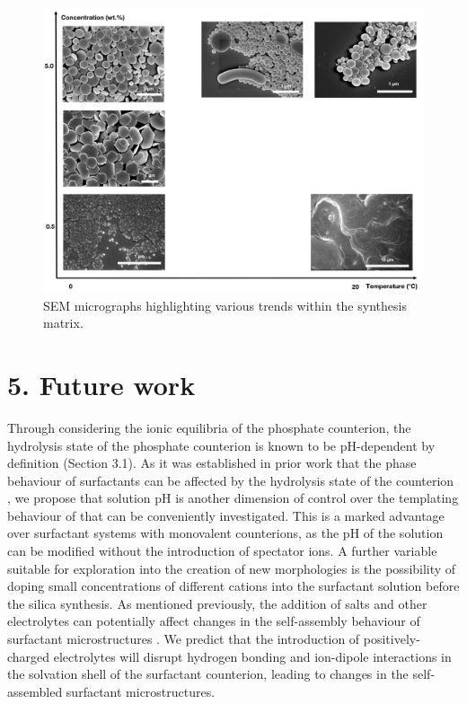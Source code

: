 \documentclass[a4paper,12pt,twocolumn]{article}
\begin{document}
	 	\begin{figure}[!b]
  	 	\centering
		\includegraphics[width=\linewidth]{trends.jpg}
  		\caption{SEM micrographs highlighting various trends within the synthesis matrix.}
  	\end{figure}

	 
	 \section{5. Future work}
	 
	 Through considering the ionic equilibria of the phosphate counterion, the hydrolysis state of the phosphate counterion is known to be pH-dependent by definition (Section 3.1). As it was established in prior work that the phase behaviour of  surfactants can be affected by the hydrolysis state of the counterion \cite{liu2014}, we propose that solution pH is another dimension of control over the templating behaviour of  that can be conveniently investigated. This is a marked advantage over surfactant systems with monovalent counterions, as the pH of the solution can be modified without the introduction of spectator ions. A further variable suitable for exploration into the creation of new morphologies is the possibility of doping small concentrations of different cations into the surfactant solution before the silica synthesis. As mentioned previously, the addition of salts and other electrolytes can potentially affect changes in the self-assembly behaviour of surfactant microstructures \cite{thalberg1991}. We predict that the introduction of positively-charged electrolytes will disrupt hydrogen bonding and ion-dipole interactions in the solvation shell of the surfactant counterion, leading to changes in the self-assembled surfactant microstructures.
	
\end{document}
